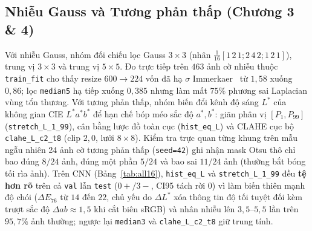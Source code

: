 \documentclass[10pt,twocolumn,a4paper]{article}
\begin{document}
\subsection{Nhiễu Gauss và Tương phản thấp (Chương 3 \& 4)}
Với nhiễu Gauss, nhóm đối chiếu lọc Gauss $3{\times}3$ (nhân $\frac{1}{16}[1\,2\,1;2\,4\,2;1\,2\,1]$), trung vị $3{\times}3$ và trung vị $5{\times}5$. Đo trực tiếp trên $463$ ảnh cờ nhiễu thuộc \texttt{train\_fit} cho thấy resize $600{\rightarrow}224$ vốn đã hạ $\sigma$ Immerkaer~\cite{immerkaer1996fast} từ $1{,}58$ xuống $0{,}86$; lọc \texttt{median5} hạ tiếp xuống $0{,}385$ nhưng làm mất $75\%$ phương sai Laplacian vùng tổn thương. Với tương phản thấp, nhóm biến đổi kênh độ sáng $L^*$ của không gian CIE $L^*a^*b^*$ để hạn chế bóp méo sắc độ $a^*,b^*$: giãn phân vị $[P_1, P_{99}]$ (\texttt{stretch\_L\_1\_99}), cân bằng lược đồ toàn cục (\texttt{hist\_eq\_L}) và CLAHE cục bộ \texttt{clahe\_L\_c2\_t8} (clip $2{,}0$, lưới $8{\times}8$). Kiểm tra trực quan từng khung trên mẫu ngẫu nhiên 24 ảnh cờ tương phản thấp (\texttt{seed=42}) ghi nhận mask Otsu thô chỉ bao đúng $8/24$ ảnh, đúng một phần $5/24$ và bao sai $11/24$ ảnh (thường bắt bóng tối rìa ảnh). Trên CNN (Bảng~\ref{tab:all16}), \texttt{hist\_eq\_L} và \texttt{stretch\_L\_1\_99} đều \textbf{tệ hơn rõ} trên cả \texttt{val} lẫn \texttt{test} ($0+/3-$, CI95 tách rời 0) vì làm biến thiên mạnh độ chói ($\Delta E_{76}$ từ $14$ đến $22$, chủ yếu do $\Delta L^*$ xóa thông tin độ tối tuyệt đối kèm trượt sắc độ $\Delta ab \approx 1{,}5$ khi cắt biên sRGB) và nhân nhiễu lên $3{,}5\text{--}5{,}5$ lần trên $95{,}7\%$ ảnh thường; ngược lại \texttt{median3} và \texttt{clahe\_L\_c2\_t8} giữ trung tính.
\end{document}

